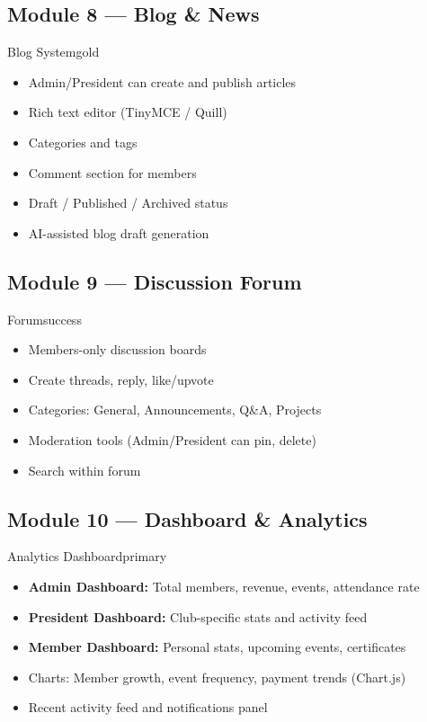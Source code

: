 \documentclass[12pt,a4paper]{article}
\begin{document}
\subsection{Module 8 --- Blog \& News}
\begin{modulebox}{Blog System}{gold}
\begin{itemize}[leftmargin=*, itemsep=3pt]
  \item Admin/President can create and publish articles
  \item Rich text editor (TinyMCE / Quill)
  \item Categories and tags
  \item Comment section for members
  \item Draft / Published / Archived status
  \item AI-assisted blog draft generation
\end{itemize}
\end{modulebox}

\subsection{Module 9 --- Discussion Forum}
\begin{modulebox}{Forum}{success}
\begin{itemize}[leftmargin=*, itemsep=3pt]
  \item Members-only discussion boards
  \item Create threads, reply, like/upvote
  \item Categories: General, Announcements, Q\&A, Projects
  \item Moderation tools (Admin/President can pin, delete)
  \item Search within forum
\end{itemize}
\end{modulebox}

\subsection{Module 10 --- Dashboard \& Analytics}
\begin{modulebox}{Analytics Dashboard}{primary}
\begin{itemize}[leftmargin=*, itemsep=3pt]
  \item \textbf{Admin Dashboard:} Total members, revenue, events, attendance rate
  \item \textbf{President Dashboard:} Club-specific stats and activity feed
  \item \textbf{Member Dashboard:} Personal stats, upcoming events, certificates
  \item Charts: Member growth, event frequency, payment trends (Chart.js)
  \item Recent activity feed and notifications panel
\end{itemize}
\end{modulebox}
\end{document}
